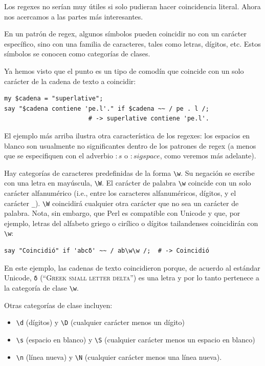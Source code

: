 Los regexes no serían muy útiles si solo pudieran hacer 
coincidencia literal. Ahora nos acercamos a las partes más 
interesantes.

En un patrón de regex, algunos símbolos pueden coincidir no
con un carácter específico, sino con una familia de caracteres,
tales como letras, dígitos, etc. Estos símbolos se conocen como
categorías de clases.

Ya hemos visto que el punto es un tipo de comodín que
coincide con un solo carácter de la cadena de texto a
coincidir:

\begin{verbatim}
my $cadena = "superlative";
say "$cadena contiene 'pe.l'." if $cadena ~~ / pe . l /;
                       # -> superlative contiene 'pe.l'.
\end{verbatim}
%

El ejemplo más arriba ilustra otra característica
de los regexes: los espacios en blanco son usualmente
no significantes dentro de los patrones de regex 
(a menos que se especifiquen con el adverbio 
$:s$ o $:sigspace$, como veremos más adelante).

Hay categorías de caracteres predefinidas de la forma \verb|\w|.
Su negación se escribe con una letra en mayúscula, \verb|\W|.
El carácter de palabra \verb|\w| coincide con un solo carácter 
alfanumérico (i.e., entre los caracteres alfanuméricos, dígitos,
y el carácter \verb|_|). \verb|\W| coincidirá cualquier otra carácter
que no sea un carácter de palabra. Nota, sin embargo, que Perl
es compatible con Unicode y que, por ejemplo, letras del alfabeto
griego o cirílico o dígitos tailandenses coincidirán con \verb|\w|:

\begin{verbatim}
say "Coincidió" if 'abcδ' ~~ / ab\w\w /;  # -> Coincidió
\end{verbatim}
%

En este ejemplo, las cadenas de texto coincidieron porque, de 
acuerdo al estándar Unicode, \verb|δ| (``\textsc{Greek small letter delta}'')
es una letra y por lo tanto pertenece a la categoría de  
clase \verb|\w|.

Otras categorías de clase incluyen:
\begin{itemize}
\item \verb|\d| (dígitos) y \verb|\D| (cualquier carácter menos un dígito)
\item \verb|\s| (espacio en blanco) y \verb|\S| (cualquier carácter menos un espacio en blanco)
\item \verb|\n| (línea nueva) y \verb|\N| (cualquier carácter menos una línea nueva).
\end{itemize}

